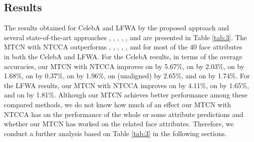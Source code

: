 \documentclass{sig-alternate-05-2015}
\begin{document}
\subsection{Results}
 The results obtained for CelebA and LFWA by the proposed approach and several state-of-the-art approaches \cite{7410782}, \cite{rudd2016moon}, \cite{hand2017attributes}, \cite{Han2017Heterogeneous}, \cite{gunther2016affact}, and \cite{ding2017deep} are presented in Table \ref{tab:3}. The MTCN with NTCCA outperforms \cite{7410782}, \cite{rudd2016moon}, \cite{hand2017attributes}, \cite{Han2017Heterogeneous}, \cite{gunther2016affact}, and \cite{ding2017deep} for most of the 40 face attributes in both the CelebA and LFWA. For the CelebA results, in terms of the average accuracies, our MTCN with NTCCA improves on \cite{7410782} by 5.67\%, on \cite{rudd2016moon} by 2.03\%, on \cite{hand2017attributes} by 1.68\%, on \cite{Han2017Heterogeneous} by 0.37\%, on \cite{gunther2016affact} by 1.96\%, on \cite{gunther2016affact} (unaligned) by 2.65\%, and on \cite{ding2017deep} by 1.74\%. For the LFWA results, our MTCN with NTCCA improves on \cite{7410782} by 4.11\%, on \cite{hand2017attributes} by 1.65\%, and on \cite{Han2017Heterogeneous} by 1.81\%. Although our MTCN achieves  better performance among these compared methods, we do not know how much of an effect our MTCN with NTCCA has on the performance of the whole or some attribute predictions and whether our MTCN has worked on the related face attributes. Therefore, we conduct a further analysis based on Table \ref{tab:3} in the following sections.
\end{document}
